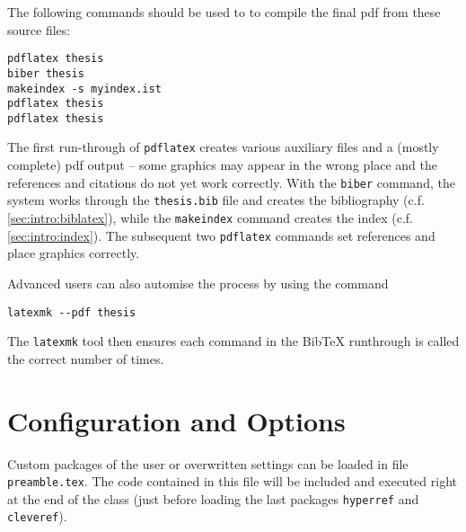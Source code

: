 The following commands should be used to to compile the final pdf from these source files:

\begin{verbatim}
pdflatex thesis
biber thesis
makeindex -s myindex.ist
pdflatex thesis
pdflatex thesis
\end{verbatim}

The first run-through of \texttt{pdflatex} creates various auxiliary files and a (mostly complete) pdf output -- some graphics may appear in the wrong place and the references and citations do not yet work correctly. With the \texttt{biber} command, the system works through the \texttt{thesis.bib} file and creates the bibliography (c.f. \cref{sec:intro:biblatex}), while the \texttt{makeindex} command creates the index (c.f. \cref{sec:intro:index}). The subsequent two \texttt{pdflatex} commands set references and place graphics correctly.

Advanced users can also automise the process by using the command
\begin{verbatim}
latexmk --pdf thesis
\end{verbatim}
The \texttt{latexmk} tool then ensures each command in the Bib\TeX{} runthrough is called the correct number of times.

\section{Configuration and Options}
\label{sec:intro:options}
Custom packages of the user or overwritten settings can be loaded in file \texttt{preamble.tex}. The code contained in this file will be included and executed right at the end of the class (just before loading the last packages \texttt{hyperref} and \texttt{cleveref}).


